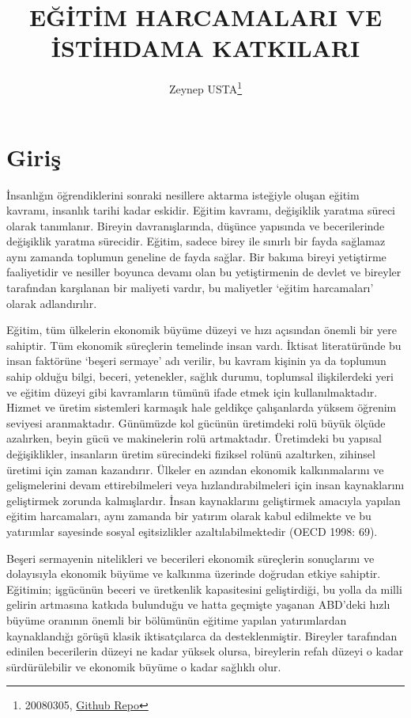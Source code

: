 \documentclass[
  12pt,
]{article}
\title{EĞİTİM HARCAMALARI VE İSTİHDAMA KATKILARI}
\author{Zeynep USTA\footnote{20080305, \href{https://github.com/ZeynepUstaa/istatistik_arasinav.git}{Github Repo}}}
\date{}
\begin{document}
\maketitle

\hypertarget{giriux15f}{%
\section{Giriş}\label{giriux15f}}

İnsanlığın öğrendiklerini sonraki nesillere aktarma isteğiyle oluşan eğitim kavramı, insanlık tarihi kadar eskidir. Eğitim kavramı, değişiklik yaratma süreci olarak tanımlanır. Bireyin davranışlarında, düşünce yapısında ve becerilerinde değişiklik yaratma sürecidir. Eğitim, sadece birey ile sınırlı bir fayda sağlamaz aynı zamanda toplumun geneline de fayda sağlar. Bir bakıma bireyi yetiştirme faaliyetidir ve nesiller boyunca devamı olan bu yetiştirmenin de devlet ve bireyler tarafından karşılanan bir maliyeti vardır, bu maliyetler `eğitim harcamaları' olarak adlandırılır.

Eğitim, tüm ülkelerin ekonomik büyüme düzeyi ve hızı açısından önemli bir yere sahiptir. Tüm ekonomik süreçlerin temelinde insan vardı. İktisat literatüründe bu insan faktörüne `beşeri sermaye' adı verilir, bu kavram kişinin ya da toplumun sahip olduğu bilgi, beceri, yetenekler, sağlık durumu, toplumsal ilişkilerdeki yeri ve eğitim düzeyi gibi kavramların tümünü ifade etmek için kullanılmaktadır. Hizmet ve üretim sistemleri karmaşık hale geldikçe çalışanlarda yüksem öğrenim seviyesi aranmaktadır. Günümüzde kol gücünün üretimdeki rolü büyük ölçüde azalırken, beyin gücü ve makinelerin rolü artmaktadır. Üretimdeki bu yapısal değişiklikler, insanların üretim sürecindeki fiziksel rolünü azaltırken, zihinsel üretimi için zaman kazandırır. Ülkeler en azından ekonomik kalkınmalarını ve gelişmelerini devam ettirebilmeleri veya hızlandırabilmeleri için insan kaynaklarını geliştirmek zorunda kalmışlardır. İnsan kaynaklarını geliştirmek amacıyla yapılan eğitim harcamaları, aynı zamanda bir yatırım olarak kabul edilmekte ve bu yatırımlar sayesinde sosyal eşitsizlikler azaltılabilmektedir (OECD 1998: 69).

Beşeri sermayenin nitelikleri ve becerileri ekonomik süreçlerin sonuçlarını ve dolayısıyla ekonomik büyüme ve kalkınma üzerinde doğrudan etkiye sahiptir. Eğitimin; işgücünün beceri ve üretkenlik kapasitesini geliştirdiği, bu yolla da milli gelirin artmasına katkıda bulunduğu ve hatta geçmişte yaşanan ABD'deki hızlı büyüme oranının önemli bir bölümünün eğitime yapılan yatırımlardan kaynaklandığı görüşü klasik iktisatçılarca da desteklenmiştir. Bireyler tarafından edinilen becerilerin düzeyi ne kadar yüksek olursa, bireylerin refah düzeyi o kadar sürdürülebilir ve ekonomik büyüme o kadar sağlıklı olur.
\end{document}
